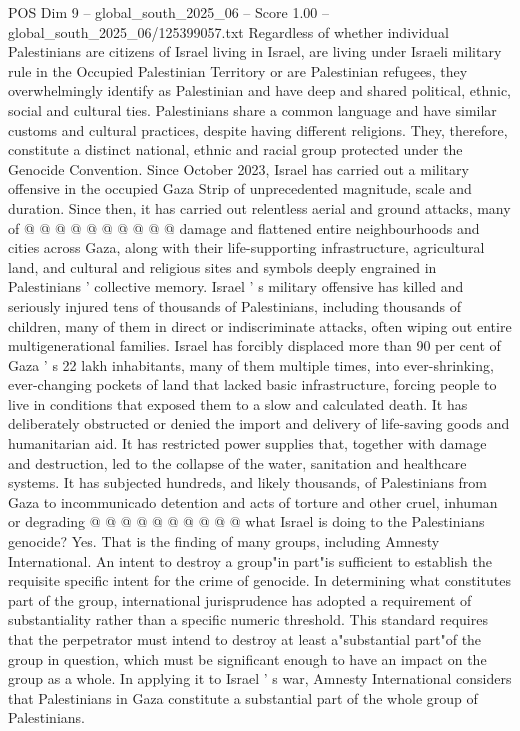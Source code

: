 \begin{textsample}{POS Dim 9 – global\_south\_2025\_06 – Score 1.00 – global\_south\_2025\_06/125399057.txt}
Regardless of whether individual Palestinians are citizens of Israel living in Israel, are living under Israeli military rule in the Occupied Palestinian Territory or are Palestinian refugees, they overwhelmingly identify as Palestinian and have deep and shared political, ethnic, social and cultural ties.
Palestinians share a common language and have similar customs and cultural practices, despite having different religions.
They, therefore, constitute a distinct national, ethnic and racial group protected under the Genocide Convention.
Since October 2023, Israel has carried out a military offensive in the occupied Gaza Strip of unprecedented magnitude, scale and duration.
Since then, it has carried out relentless aerial and ground attacks, many of @ @ @ @ @ @ @ @ @ @ damage and flattened entire neighbourhoods and cities across Gaza, along with their life-supporting infrastructure, agricultural land, and cultural and religious sites and symbols deeply engrained in Palestinians ' collective memory.
Israel ' s military offensive has killed and seriously injured tens of thousands of Palestinians, including thousands of children, many of them in direct or indiscriminate attacks, often wiping out entire multigenerational families.
Israel has forcibly displaced more than 90 per cent of Gaza ' s 22 lakh inhabitants, many of them multiple times, into ever-shrinking, ever-changing pockets of land that lacked basic infrastructure, forcing people to live in conditions that exposed them to a slow and calculated death.
It has deliberately obstructed or denied the import and delivery of life-saving goods and humanitarian aid.
It has restricted power supplies that, together with damage and destruction, led to the collapse of the water, sanitation and healthcare systems.
It has subjected hundreds, and likely thousands, of Palestinians from Gaza to incommunicado detention and acts of torture and other cruel, inhuman or degrading @ @ @ @ @ @ @ @ @ @ what Israel is doing to the Palestinians genocide?
Yes.
That is the finding of many groups, including Amnesty International.
An intent to destroy a group"in part"is sufficient to establish the requisite specific intent for the crime of genocide.
In determining what constitutes part of the group, international jurisprudence has adopted a requirement of substantiality rather than a specific numeric threshold.
This standard requires that the perpetrator must intend to destroy at least a"substantial part"of the group in question, which must be significant enough to have an impact on the group as a whole.
In applying it to Israel ' s war, Amnesty International considers that Palestinians in Gaza constitute a substantial part of the whole group of Palestinians.

\end{textsample}
